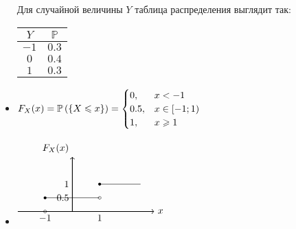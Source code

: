 \documentclass{article}
\begin{document}
\begin{itemize}
    \comment Для случайной величины $Y$ таблица распределения выглядит так: \begin{tabular}{c|c}
        $Y$&$\mathbb{P}$\\
        \hline
        $-1$&$0.3$\\
        \hline
        $0$&$0.4$\\
        \hline
        $1$&$0.3$
    \end{tabular}
    \item $F_{X}(x)=\mathbb{P}\left(\{X\leqslant x\}\right)=\begin{cases}
        0,&x<-1\\
        0.5,&x\in[-1;1)\\
        1,&x\geqslant 1
    \end{cases}$
    \item $\begin{tikzpicture}
        \draw[black, ->, thick] (-2,0) -- (3,0) node [right] {$x$};
        \draw[black, ->, thick] (0,0) -- (0,2) node [above left] {$F_X(x)$};
        \draw[black, thin] (-1,0.5) -- (1,0.5);
        \fill[black] (-1,0.5) circle (1.5pt);
        \draw[black, thin] (1,1) -- (2.5,1);
        \fill[black] (1,1) circle (1.5pt);
        \draw (1,0.5) circle (1.5pt);
        \draw (-1,0) node [black, below] {$-1$} circle (1.5pt);
        \draw[black] (1,0) node [black, below] {$1$};
        \draw[black] (0,0.5) node [black, left] {$0.5$};
        \draw[black] (0,1) node [black, left] {$1$};
    \end{tikzpicture}$
\end{itemize}
\end{document}
